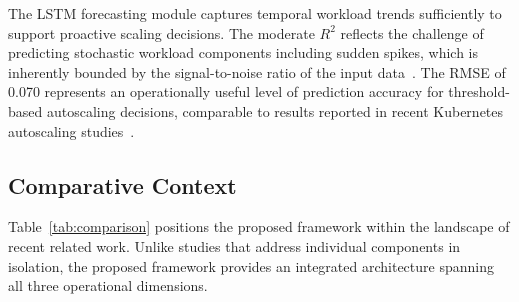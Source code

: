 \documentclass[sn-nature]{sn-jnl}
\theoremstyle{thmstyleone}
\theoremstyle{thmstyletwo}
\theoremstyle{thmstylethree}
\begin{document}
The LSTM forecasting module captures temporal workload trends sufficiently to support proactive scaling decisions. The moderate $R^2$ reflects the challenge of predicting stochastic workload components including sudden spikes, which is inherently bounded by the signal-to-noise ratio of the input data~\cite{guruge2025prophet}. The RMSE of 0.070 represents an operationally useful level of prediction accuracy for threshold-based autoscaling decisions, comparable to results reported in recent Kubernetes autoscaling studies~\cite{dasilva2025adaptive}.

\subsection{Comparative Context}\label{subsec:comparison}

Table~\ref{tab:comparison} positions the proposed framework within the landscape of recent related work. Unlike studies that address individual components in isolation, the proposed framework provides an integrated architecture spanning all three operational dimensions.

\begin{table}[htbp]
\centering
\caption{Comparison with related work}\label{tab:comparison}
\end{table}
\end{document}

